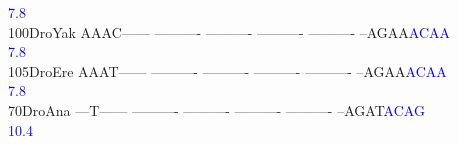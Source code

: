 \documentclass[11pt,twoside,reqno,a4paper]{article}
\begin{document}
{\hspace*{4\charwidth}\hspace*{7\charwidth}\hspace*{1\charwidth}\hspace*{1\charwidth}\hspace*{1\charwidth}\hspace*{1\charwidth}\hspace*{1\charwidth}\hspace*{56\charwidth}\textcolor{blue}{7.8}\hspace*{1\charwidth}\\
100\hspace*{1\charwidth}DroYak	AAAC------	----------	----------	----------	----------	--AGAA\textcolor{blue}{A}\textcolor{blue}{C}\textcolor{blue}{A}\textcolor{blue}{A}	\\
\hspace*{4\charwidth}\hspace*{7\charwidth}\hspace*{1\charwidth}\hspace*{1\charwidth}\hspace*{1\charwidth}\hspace*{1\charwidth}\hspace*{1\charwidth}\hspace*{56\charwidth}\textcolor{blue}{7.8}\hspace*{1\charwidth}\\
105\hspace*{1\charwidth}DroEre	AAAT------	----------	----------	----------	----------	--AGAA\textcolor{blue}{A}\textcolor{blue}{C}\textcolor{blue}{A}\textcolor{blue}{A}	\\
\hspace*{4\charwidth}\hspace*{7\charwidth}\hspace*{1\charwidth}\hspace*{1\charwidth}\hspace*{1\charwidth}\hspace*{1\charwidth}\hspace*{1\charwidth}\hspace*{56\charwidth}\textcolor{blue}{7.8}\hspace*{1\charwidth}\\
70\hspace*{2\charwidth}DroAna	---T------	----------	----------	----------	----------	--AGAT\textcolor{blue}{A}\textcolor{blue}{C}\textcolor{blue}{A}\textcolor{blue}{G}	\\
\hspace*{4\charwidth}\hspace*{7\charwidth}\hspace*{1\charwidth}\hspace*{1\charwidth}\hspace*{1\charwidth}\hspace*{1\charwidth}\hspace*{1\charwidth}\hspace*{56\charwidth}\textcolor{blue}{10.4}\hspace*{1\charwidth}\\
}
\end{document}

